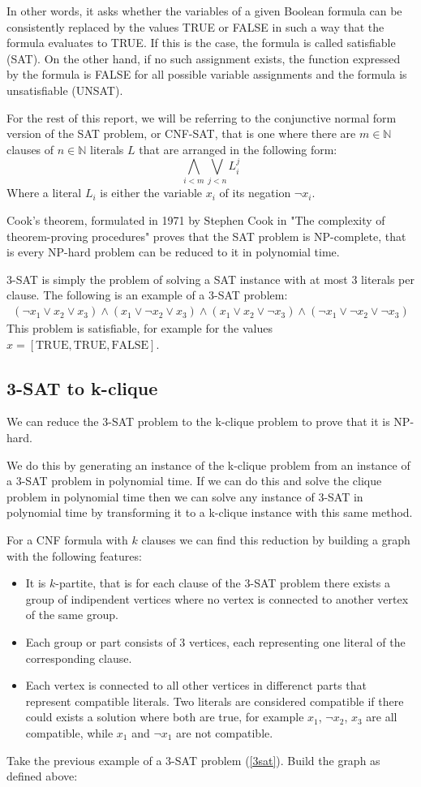 \documentclass[table]{article}
\newcommand{\TRUE}{\text{TRUE}}
\newcommand{\FALSE}{\text{FALSE}}
\begin{document}
In other words, it asks whether the variables of a given Boolean formula can be consistently replaced by the values TRUE or FALSE in such a way that the formula evaluates to TRUE. If this is the case, the formula is called satisfiable (SAT). On the other hand, if no such assignment exists, the function expressed by the formula is FALSE for all possible variable assignments and the formula is unsatisfiable (UNSAT).

For the rest of this report, we will be referring to the conjunctive normal form version of the SAT problem, or CNF-SAT, that is one where there are $m\in\mathbb{N}$ clauses of $n\in\mathbb{N}$ literals $L$ that are arranged in the following form:
\[ \bigwedge_{i<m}\bigvee_{j<n}L_i^j \]
Where a literal $L_i$ is either the variable $x_i$ of its negation $\neg x_i$.

Cook's theorem, formulated in 1971 by Stephen Cook in "The complexity of theorem-proving procedures"%
proves that the SAT problem is NP-complete, that is every NP-hard problem can be reduced to it in polynomial time.

3-SAT is simply the problem of solving a SAT instance with at most 3 literals per clause. The following is an example of a 3-SAT problem:
\begin{align}
    (\neg x_1 \lor x_2 \lor x_3)\land(x_1 \lor \neg x_2 \lor x_3)\land(x_1 \lor x_2 \lor \neg x_3)\land(\neg x_1 \lor \neg x_2 \lor \neg x_3)\label{3sat}
\end{align}
This problem is satisfiable, for example for the values $x = [\TRUE, \TRUE, \FALSE]$. 
\subsection{3-SAT to k-clique}
We can reduce the 3-SAT problem to the k-clique problem to prove that it is NP-hard.

We do this by generating an instance of the k-clique problem from an instance of a 3-SAT problem in polynomial time. 
If we can do this and solve the clique problem in polynomial time then we can solve any instance of 3-SAT in polynomial time by transforming it to a k-clique instance with this same method.

For a CNF formula with $k$ clauses we can find this reduction by building a graph with the following features:
\begin{itemize}
    \item It is $k$-partite, that is for each clause of the 3-SAT problem there exists a group of indipendent vertices where no vertex is connected to another vertex of the same group.
    \item Each group or part consists of 3 vertices, each representing one literal of the corresponding clause.
    \item Each vertex is connected to all other vertices in differenct parts that represent compatible literals. Two literals are considered compatible if there could exists a solution where both are true, for example $x_1$, $\neg x_2$, $x_3$ are all compatible, while $x_1$ and $\neg x_1$ are not compatible.
\end{itemize}
Take the previous example of a 3-SAT problem (\ref{3sat}). Build the graph as defined above:
\end{document}
